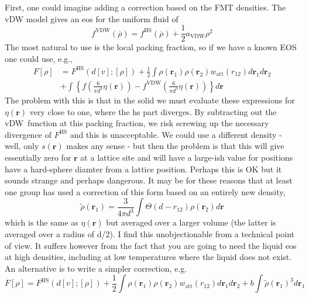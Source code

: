 \documentclass[aps,preprint]{revtex4-1}%
\begin{document}
First, one could imagine adding a correction based on the FMT densities. The
vDW model gives an eos for the uniform fluid of
\begin{equation}
f^{\text{VDW}}\left(  \overline{\rho}\right)  =f^{\text{HS}}\left(
\overline{\rho}\right)  +\frac{1}{2}a_{\text{VDW}}\rho^{2}%
\end{equation}
The most natural to use is the local packing fraction, so if we have a known
EOS one could use, e.g.,%
\begin{align}
F\left[  \rho\right]    & =F^{\text{HS}}\left(  d\left[  v\right]  ;\left[
\rho\right]  \right)  +\frac{1}{2}\int\rho\left(  \mathbf{r}_{1}\right)
\rho\left(  \mathbf{r}_{2}\right)  w_{\text{att}}\left(  r_{12}\right)
d\mathbf{r}_{1}d\mathbf{r}_{2}\\
& +\int\left\{  f\left(  \frac{6}{\pi d^{3}}\eta\left(  \mathbf{r}\right)
\right)  -f^{\text{VDW}}\left(  \frac{6}{\pi d^{3}}\eta\left(  \mathbf{r}%
\right)  \right)  \right\}  d\mathbf{r}\nonumber
\end{align}
The problem with this is that in the solid we must evaluate these expressions
for $\eta\left(  \mathbf{r}\right)  $ very close to one, where the hs part
diverges. By subtracting out the vDW\ function at this packing fraction, we
risk screwing up the necessary divergence of  $F^{\text{HS}}$ and this is
unacceptable. We could use a different density - well, only $s\left(
\mathbf{r}\right)  $ makes any sense - but then the problem is that this will
give essentially zero for $\mathbf{r}$ at a lattice site and will have a
large-ish value for positions have a hard-sphere diamter from a lattice
position. Perhaps this is OK but it sounds strange and perhaps dangerous. It
may be for these reasons that at least one group has used a correction of this
form based on an entirely new density,
\[
\widetilde{\rho}\left(  \mathbf{r}_{1}\right)  =\frac{3}{4\pi d^{3}}\int%
\Theta\left(  d-r_{12}\right)  \rho\left(  \mathbf{r}_{2}\right)  d\mathbf{r}%
\]
which is the same as $\eta\left(  \mathbf{r}\right)  $ but averaged over a
larger volume (the latter is averaged over a radius of d/2). I find this
unobjectionable from a technical point of view. It suffers however from the
fact that you are going to need the liquid eos at high densities, including at
low temperatures where the liquid does not exist. An alternative is to write a
simpler correction, e.g.
\begin{equation}
F\left[  \rho\right]  =F^{\text{HS}}\left(  d\left[  v\right]  ;\left[
\rho\right]  \right)  +\frac{1}{2}\int\rho\left(  \mathbf{r}_{1}\right)
\rho\left(  \mathbf{r}_{2}\right)  w_{\text{att}}\left(  r_{12}\right)
d\mathbf{r}_{1}d\mathbf{r}_{2}+b\int\widetilde{\rho}\left(  \mathbf{r}%
_{1}\right)  ^{3}d\mathbf{r}_{1}%
\end{equation}
\end{document}
